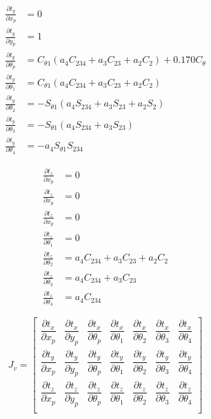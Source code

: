 \begin{equation*}
    \begin{split}
        \frac{\partial t_y}{\partial x_p} & = 0 \\
        \frac{\partial t_y}{\partial y_p} & = 1 \\
        \frac{\partial t_y}{\partial \theta_p} & = C_{\theta 1} ( a_4C_{234} + a_3C_{23} + a_2C_2 ) + 0.170C_\theta \\
        \frac{\partial t_y}{\partial \theta_1} & = C_{\theta 1} ( a_4C_{234} + a_3C_{23} + a_2C_2 )  \\
        \frac{\partial t_y}{\partial \theta_2} & = -S_{\theta 1} ( a_4S_{234} + a_3S_{23} + a_2S_2 ) \\
        \frac{\partial t_y}{\partial \theta_3} & = -S_{\theta 1} ( a_4S_{234} + a_3S_{23} ) \\
        \frac{\partial t_y}{\partial \theta_4} & = -a_4S_{\theta 1}S_{234}
    \end{split}
\end{equation*}

\newpage
\begin{equation*}
    \begin{split}
        \frac{\partial t_z}{\partial x_p} & = 0 \\
        \frac{\partial t_z}{\partial x_p} & = 0 \\
        \frac{\partial t_z}{\partial x_p} & = 0 \\
        \frac{\partial t_z}{\partial \theta_1} & = 0 \\
        \frac{\partial t_z}{\partial \theta_2} & = a_4C_{234} + a_3C_{23} + a_2C_2 \\
        \frac{\partial t_z}{\partial \theta_3} & = a_4C_{234} + a_3C_{23} \\
        \frac{\partial t_z}{\partial \theta_4} & = a_4C_{234}
    \end{split}
\end{equation*}

\begin{equation*}
    J_v =
    \begin{bmatrix}
        \dfrac{\partial t_x}{\partial x_p} & \dfrac{\partial t_x}{\partial y_p} & \dfrac{\partial t_x}{\partial \theta_p} & \dfrac{\partial t_x}{\partial \theta_1} & \dfrac{\partial t_x}{\partial \theta_2} & \dfrac{\partial t_x}{\partial \theta_3} & \dfrac{\partial t_x}{\partial \theta_4} \\
        \dfrac{\partial t_y}{\partial x_p} & \dfrac{\partial t_y}{\partial y_p} & \dfrac{\partial t_y}{\partial \theta_p} & \dfrac{\partial t_y}{\partial \theta_1} & \dfrac{\partial t_y}{\partial \theta_2} & \dfrac{\partial t_y}{\partial \theta_3} & \dfrac{\partial t_y}{\partial \theta_4} \\
        \dfrac{\partial t_z}{\partial x_p} & \dfrac{\partial t_z}{\partial y_p} & \dfrac{\partial t_z}{\partial \theta_p} & \dfrac{\partial t_z}{\partial \theta_1} & \dfrac{\partial t_z}{\partial \theta_2} & \dfrac{\partial t_z}{\partial \theta_3} & \dfrac{\partial t_z}{\partial \theta_4} \\
    \end{bmatrix}
\end{equation*}

